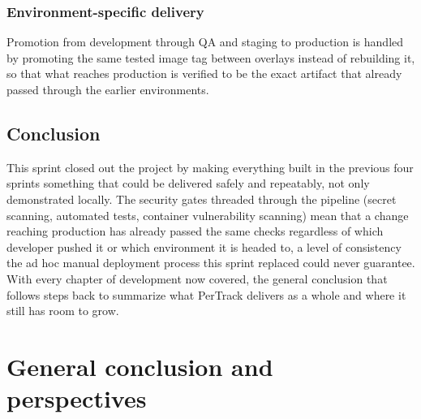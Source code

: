 \documentclass[12pt,a4paper]{report}
\begin{document}
\subsection{Environment-specific delivery}

Promotion from development through QA and staging to production is handled by promoting the same tested image tag between overlays instead of rebuilding it, so that what reaches production is verified to be the exact artifact that already passed through the earlier environments.

\section{Conclusion}

This sprint closed out the project by making everything built in the previous four sprints something that could be delivered safely and repeatably, not only demonstrated locally. The security gates threaded through the pipeline (secret scanning, automated tests, container vulnerability scanning) mean that a change reaching production has already passed the same checks regardless of which developer pushed it or which environment it is headed to, a level of consistency the ad hoc manual deployment process this sprint replaced could never guarantee. With every chapter of development now covered, the general conclusion that follows steps back to summarize what PerTrack delivers as a whole and where it still has room to grow.

\chapter*{General conclusion and perspectives}
\end{document}
